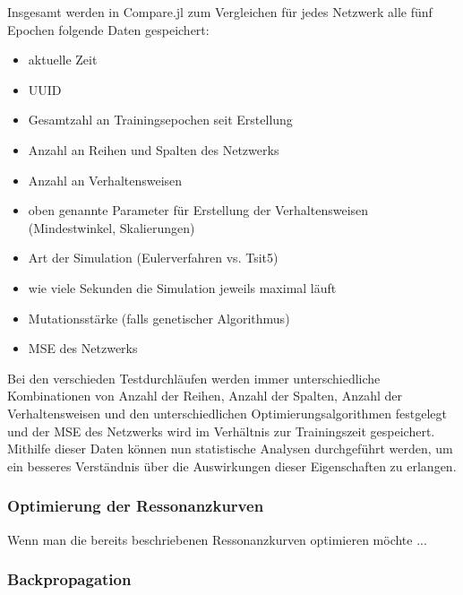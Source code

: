 Insgesamt werden in Compare.jl zum Vergleichen für jedes Netzwerk alle fünf Epochen folgende Daten gespeichert:

\begin{itemize}
    \item aktuelle Zeit
    \item UUID
    \item Gesamtzahl an Trainingsepochen seit Erstellung
    \item Anzahl an Reihen und Spalten des Netzwerks
    \item Anzahl an Verhaltensweisen
    \item oben genannte Parameter für Erstellung der Verhaltensweisen (Mindestwinkel, Skalierungen)
    \item Art der Simulation (Eulerverfahren vs. Tsit5) %
    \item wie viele Sekunden die Simulation jeweils maximal läuft
    \item Mutationsstärke (falls genetischer Algorithmus)
    \item MSE des Netzwerks
\end{itemize}

    
    
    

Bei den verschieden Testdurchläufen werden immer unterschiedliche Kombinationen von Anzahl der Reihen, Anzahl der Spalten, Anzahl der Verhaltensweisen und den unterschiedlichen Optimierungsalgorithmen festgelegt und der MSE des Netzwerks wird im Verhältnis zur Trainingszeit gespeichert. Mithilfe dieser Daten können nun statistische Analysen durchgeführt werden, um ein besseres Verständnis über die Auswirkungen dieser Eigenschaften zu erlangen.

\subsubsection{Optimierung der Ressonanzkurven}

Wenn man die bereits beschriebenen Ressonanzkurven optimieren möchte ...

\subsubsection{Backpropagation}

